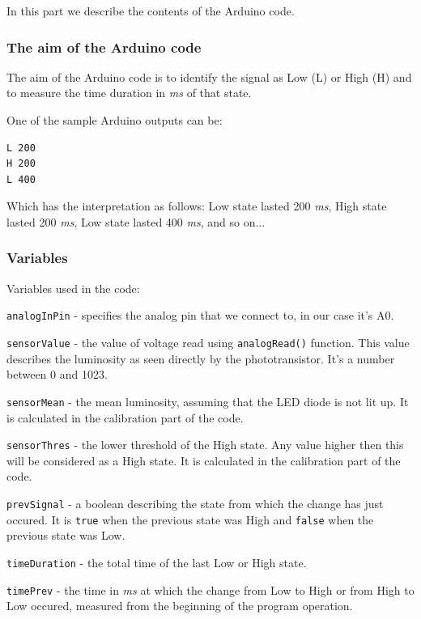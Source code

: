 \documentclass[12pt]{report}
\begin{document}
In this part we describe the contents of the Arduino code.

\subsubsection{The aim of the Arduino code}

The aim of the Arduino code is to identify the signal as Low (L) or High (H) and to measure the time duration in \textit{ms} of that state.

One of the sample Arduino outputs can be:

\begin{snugshade}
\begin{verbatim}
L 200
H 200
L 400
\end{verbatim}
\end{snugshade}

Which has the interpretation as follows: Low state lasted 200 \textit{ms}, High state lasted 200 \textit{ms}, Low state lasted 400 \textit{ms}, and so on...




\subsubsection{Variables}

Variables used in the code:

\verb|analogInPin| - specifies the analog pin that we connect to, in our case it's A0.

\verb|sensorValue| - the value of voltage read using \verb|analogRead()| function. This value describes the luminosity as seen directly by the phototransistor. It's a number between 0 and 1023.

\verb|sensorMean| - the mean luminosity, assuming that the LED diode is not lit up. It is calculated in the calibration part of the code.

\verb|sensorThres| - the lower threshold of the High state. Any value higher then this will be considered as a High state. It is calculated in the calibration part of the code.

\verb|prevSignal| - a boolean describing the state from which the change has just occured. It is \verb|true| when the previous state was High and \verb|false| when the previous state was Low.

\verb|timeDuration| - the total time of the last Low or High state.

\verb|timePrev| - the time in \textit{ms} at which the change from Low to High or from High to Low occured, measured from the beginning of the program operation.
\end{document}

